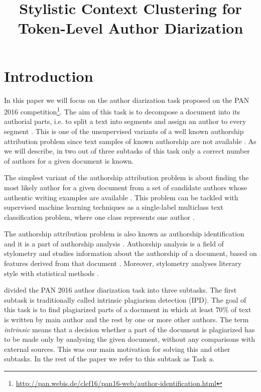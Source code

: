 \documentclass[10pt, a4paper]{article}
\title{Stylistic Context Clustering for Token-Level Author Diarization}
\begin{document}
\maketitleabstract

\section{Introduction}
In this paper we will focus on the author diarization task proposed on the PAN 2016 competition\footnote{\url{http://pan.webis.de/clef16/pan16-web/author-identification.html}}. The aim of this task is to decompose a document into its authorial parts, i.e. to split a text into segments and assign an author to every segment \citep{koppel-2011,aldebei-2015}. This is one of the unsupervised variants of a well known authorship attribution problem since text samples of known authorship are not available \citep{rosso-2016}. As we will describe, in two out of three subtasks of this task only a correct number of authors for a given document is known.

The simplest variant of the authorship attribution problem is about finding the most likely author for a given document from a set of candidate authors whose authentic writing examples are available \citep{stamatatos-2009a,stein-2011,ding-2016}. This problem can be tackled with supervised machine learning techniques as a {{{single-label}}} multiclass text classification problem, where one class represents one author \citep{stamatatos-2009a}. 

The authorship attribution problem is also known as authorship identification and it is a part of authorship analysis \citep{stamatatos-2009a,ding-2016}. Authorship analysis is a field of stylometry and studies information about the authorship of a document, based on features derived from that document \citep{layton-2013}. Moreover, stylometry analyses literary style with statistical methods  \citep{stein-2011}.	

\citet{rosso-2016} divided the PAN 2016 author diarization task into three subtasks. The first subtask is traditionally called intrinsic plagiarism detection (IPD). The goal of this task is to find plagiarized parts of a document in which at least $70\%$ of text is written by main author and the rest by one or more other authors. The term \emph{intrinsic} means that a decision whether a part of the document is plagiarized has to be made only by analysing the given document, without any comparisons with external sources. This was our main motivation for solving this and other subtasks. In the rest of the paper we refer to this subtask as Task \emph{a}.
\end{document}
